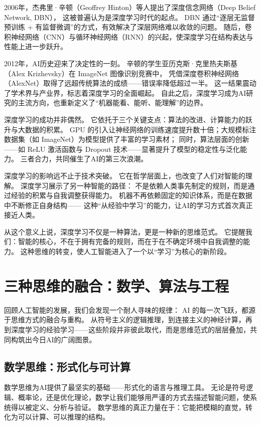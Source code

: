 2006年，杰弗里·辛顿（Geoffrey Hinton）等人提出了深度信念网络（Deep Belief Network, DBN），  
这被普遍认为是深度学习时代的起点。  
DBN 通过“逐层无监督预训练 + 有监督微调”的方式，有效解决了深层网络难以收敛的问题。  
随后，卷积神经网络（CNN）与循环神经网络（RNN）的兴起，使深度学习在结构表达与性能上进一步跃升。

2012年，AI历史迎来了决定性的一刻。  
辛顿的学生亚历克斯·克里热夫斯基（Alex Krizhevsky）在 ImageNet 图像识别竞赛中，  
凭借深度卷积神经网络（AlexNet）取得了远超传统算法的成绩——错误率降低超过一半。  
这一结果震动了学术界与产业界，标志着深度学习的全面崛起。  
自此之后，深度学习成为AI研究的主流方向，也重新定义了“机器能看、能听、能理解”的边界。

深度学习的成功并非偶然。  
它依托于三个关键支点：算法的改进、计算能力的跃升与大数据的积累。  
GPU 的引入让神经网络的训练速度提升数十倍；大规模标注数据集（如 ImageNet）为模型提供了丰富的学习素材；  
同时，算法层面的创新——如 ReLU 激活函数与 Dropout 技术——显著提升了模型的稳定性与泛化能力。  
三者合力，共同催生了AI的第三次浪潮。

深度学习的影响远不止于技术突破。  
它在哲学层面上，也改变了人们对智能的理解。  
深度学习展示了另一种智能的路径：  
不是依赖人类事先制定的规则，而是通过经验的积累与自我调整获得能力。  
机器不再依赖固定的知识体系，而是在数据中不断修正自身结构——  
这种“从经验中学习”的能力，让AI的学习方式首次真正接近人类。

从这个意义上说，深度学习不仅是一种算法，更是一种新的思维范式。  
它提醒我们：智能的核心，不在于拥有完备的规则，而在于在不确定环境中自我调整的能力。  
这种思维的转变，使人工智能进入了一个以“学习”为核心的新阶段。

\section{三种思维的融合：数学、算法与工程}

回顾人工智能的发展，我们会发现一个耐人寻味的规律：  
AI 的每一次飞跃，都源于思维方式的融合与重构。  
从符号主义的逻辑推理，到连接主义的神经计算，再到深度学习的经验学习——这些阶段并非彼此取代，而是思维范式的层层叠加，共同构筑出今日AI的广阔图景。

\subsection{数学思维：形式化与可计算}

数学思维为AI提供了最坚实的基础——形式化的语言与推理工具。  
无论是符号逻辑、概率论，还是优化理论，数学让我们能够用严谨的方式去描述智能问题，使系统得以被定义、分析与验证。  
数学思维的真正力量在于：它能把模糊的直觉，转化为可以计算、可以推理的结构。

